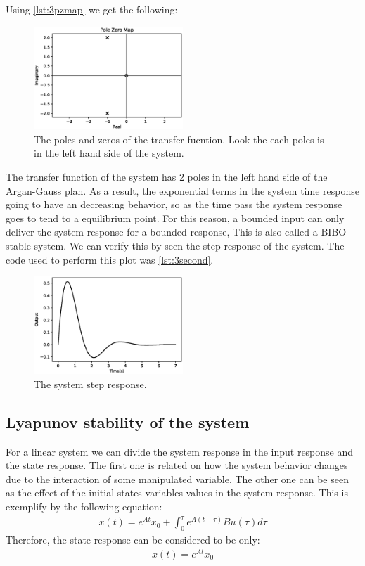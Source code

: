 \documentclass[a4paper]{article}
\begin{document}
Using \ref{lst:3pzmap} we get the following:
\begin{figure}[H]
    \centering
    \includegraphics[width=0.5\textwidth]{Figures/Question3/EXE_3_POLE_ZERO_MAP.eps}
    \caption{The poles and zeros of the transfer fucntion. Look the each poles is in the left hand side of the system.}
    \label{fig:POLE_ZERO_MAP_3}
\end{figure}

The transfer function of the system has 2 poles in the left hand side of the Argan-Gauss plan. As a result, the exponential terms in the system time response going to have an decreasing behavior, so as the time pass the system response goes to tend to a equilibrium point. For this reason, a bounded input can only deliver the system response for a bounded response, This is also called a BIBO stable system. We can verify this by seen the step response of the system. The code used to perform this plot was \ref{lst:3second}.
\begin{figure}[H]
    \centering
    \includegraphics[width=0.5\textwidth]{Figures/Question3/EXE_3_SYS_OUTPUT.eps}
    \caption{The system  step response.}
    \label{fig:EXE_3_STEP_RESPONSE}
\end{figure}
\subsection*{Lyapunov stability of the system}
For a linear system we can divide the system response in the input response and the state response. The first one is related on how the system behavior changes due to the interaction of some manipulated variable. The other one can be seen as the effect of the initial states variables values in the system response. This is exemplify by the following equation:
\begin{align}
x(t) = e^{At}x_0+\int_0^\tau e^{A(t-\tau)}Bu(\tau)d\tau  
\end{align}
Therefore, the state response can be considered to be only:
\begin{align}
x(t) =  e^{At}x_0
\end{align}
\end{document}

